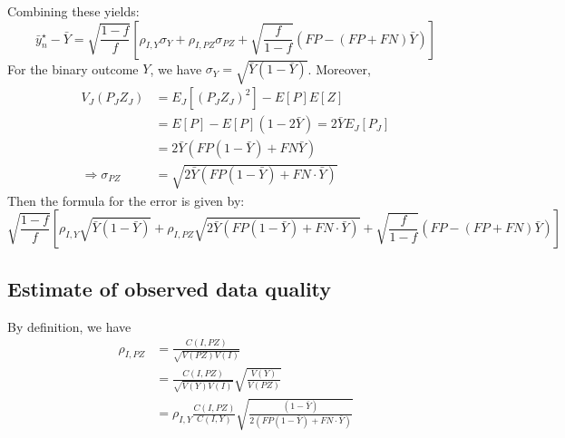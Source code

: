 \documentclass[aoas]{amsart}
\begin{document}
Combining these yields:
$$
\bar y_n^\star - \bar Y = \sqrt{\frac{1-f}{f}} \left[\rho_{I,Y} \sigma_Y + \rho_{I, PZ} \sigma_{PZ} + \sqrt{\frac{f}{1-f}} \left( FP - (FP+FN) \bar Y \right) \right]
$$
For the binary outcome $Y$, we have $\sigma_Y = \sqrt{\bar Y (1-\bar Y)}$. Moreover,
$$
\begin{aligned}
V_J(P_J Z_J) &= E_J[(P_J Z_J)^2] - E[P] E[Z] \\
&= E[P] - E[P] (1 - 2 \bar Y) = 2 \bar Y E_J [ P_J ] \\
&= 2 \bar Y \left( FP (1-\bar Y) + FN \bar Y \right) \\
\Rightarrow \sigma_{PZ} &= \sqrt{ 2 \bar Y \left( FP (1-\bar Y) + FN \cdot  \bar Y \right) }
\end{aligned}
$$
Then the formula for the error is given by:
$$
\sqrt{\frac{1-f}{f}} \left[\rho_{I,Y} \sqrt{\bar Y (1-\bar Y)} + \rho_{I, PZ} \sqrt{ 2 \bar Y \left( FP (1-\bar Y) + FN \cdot \bar Y \right )} + \sqrt{\frac{f}{1-f}} \left( FP - (FP+FN) \bar Y \right) \right]
$$

\subsection{Estimate of observed data quality}

By definition, we have
$$
\begin{aligned}
\rho_{I,PZ} &= \frac{C(I, PZ)}{\sqrt{V(PZ) V(I)}} \\
&= \frac{C(I, PZ)}{\sqrt{V(Y) V(I)}} \sqrt{\frac{V(Y)}{V(PZ)}} \\
&= \rho_{I,Y} \frac{C(I,PZ)}{C(I,Y)} \sqrt{ \frac{(1-\bar Y)}{2 ( FP (1-\bar Y) + FN \cdot \bar Y)} }
\end{aligned}
$$
\end{document}
